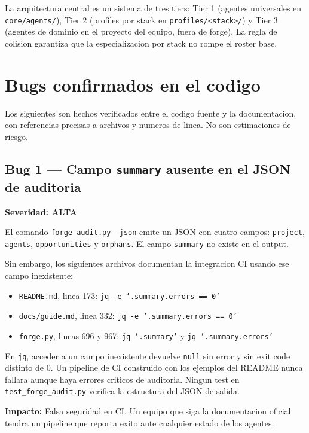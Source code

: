 \documentclass[12pt,a4paper]{article}
\begin{document}
La arquitectura central es un sistema de tres tiers: Tier 1 (agentes universales en
\texttt{core/agents/}), Tier 2 (profiles por stack en \texttt{profiles/<stack>/}) y
Tier 3 (agentes de dominio en el proyecto del equipo, fuera de forge). La regla de
colision garantiza que la especializacion por stack no rompe el roster base.

\section{Bugs confirmados en el codigo}

Los siguientes son hechos verificados entre el codigo fuente y la documentacion,
con referencias precisas a archivos y numeros de linea. No son estimaciones de riesgo.

\subsection{Bug 1 — Campo \texttt{summary} ausente en el JSON de auditoria}

\textbf{\textcolor{criticalred}{Severidad: ALTA}}

El comando \texttt{forge-audit.py --json} emite un JSON con cuatro campos:
\texttt{project}, \texttt{agents}, \texttt{opportunities} y \texttt{orphans}.
El campo \texttt{summary} no existe en el output.

Sin embargo, los siguientes archivos documentan la integracion CI usando ese campo
inexistente:

\begin{itemize}
  \item \texttt{README.md}, linea 173: \texttt{jq -e '.summary.errors == 0'}
  \item \texttt{docs/guide.md}, linea 332: \texttt{jq -e '.summary.errors == 0'}
  \item \texttt{forge.py}, lineas 696 y 967: \texttt{jq '.summary'} y
        \texttt{jq '.summary.errors'}
\end{itemize}

En \texttt{jq}, acceder a un campo inexistente devuelve \texttt{null} sin error y
sin exit code distinto de 0. Un pipeline de CI construido con los ejemplos del README
nunca fallara aunque haya errores criticos de auditoria. Ningun test en
\texttt{test\_forge\_audit.py} verifica la estructura del JSON de salida.

\textbf{Impacto:} Falsa seguridad en CI. Un equipo que siga la documentacion oficial
tendra un pipeline que reporta exito ante cualquier estado de los agentes.
\end{document}
